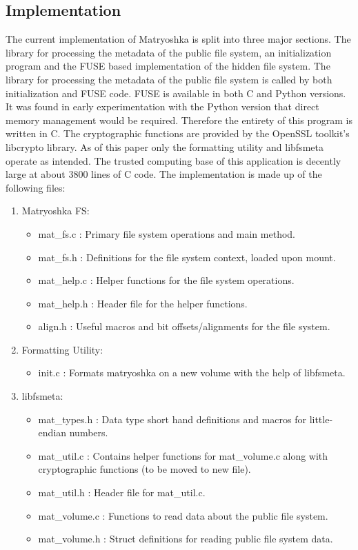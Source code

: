 \documentclass{article}
\begin{document}
\begin{multicols}{2}
\section{Implementation}
The current implementation of Matryoshka is split into three major sections. The library for processing the metadata of the public file system, an initialization program and the FUSE based implementation of the hidden file system. The library for processing the metadata of the public file system is called by both initialization and FUSE code. FUSE is available in both C and Python versions. It was found in early experimentation with the Python version that direct memory management would be required. Therefore the entirety of this program is written in C. The cryptographic functions are provided by the OpenSSL toolkit's libcrypto library. As of this paper only the formatting utility and libfsmeta operate as intended. The trusted computing base of this application is decently large at about 3800 lines of C code. The implementation is made up of the following files:
\begin{enumerate}[noitemsep]
\item Matryoshka FS:
  \begin{itemize}[noitemsep]
    \item mat\_fs.c : Primary file system operations and main method.
    \item mat\_fs.h : Definitions for the file system context, loaded upon mount.
    \item mat\_help.c : Helper functions for the file system operations.
    \item mat\_help.h : Header file for the helper functions.
    \item align.h : Useful macros and bit offsets/alignments for the file system.
  \end{itemize}
\item Formatting Utility:
  \begin{itemize}[noitemsep]
    \item init.c : Formats matryoshka on a new volume with the help of libfsmeta.
  \end{itemize}
\item libfsmeta:
  \begin{itemize}[noitemsep]
    \item mat\_types.h : Data type short hand definitions and macros for little-endian numbers. 
    \item mat\_util.c : Contains helper functions for mat\_volume.c along with cryptographic functions (to be moved to new file).
    \item mat\_util.h : Header file for mat\_util.c.
    \item mat\_volume.c : Functions to read data about the public file system.
    \item mat\_volume.h : Struct definitions for reading public file system data.
  \end{itemize}
\end{enumerate}


\end{multicols}
\end{document}
